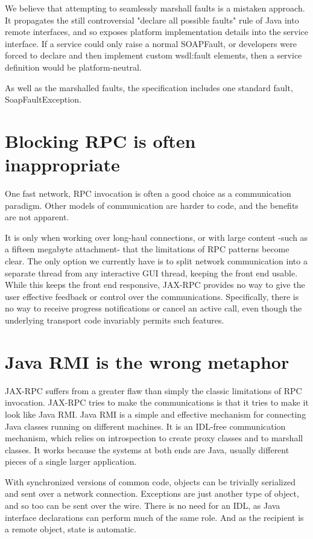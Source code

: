 \documentclass[draft]{article}
\begin{document}
We believe that attempting to seamlessly marshall faults is a mistaken approach.
It propagates the still controversial "declare all possible faults" rule of Java
into remote interfaces, and so exposes platform implementation details into the
service interface. If a service could only raise a normal SOAPFault, or
developers were forced to declare and then implement custom wsdl:fault elements,
then a service definition would be platform-neutral. 

As well as the marshalled faults, the specification includes one
standard fault, SoapFaultException. 

\section{Blocking RPC is often inappropriate}

One fast network, RPC invocation is often a good choice as a
communication paradigm. Other models of communication are harder to
code, and the benefits are not apparent. 

It is only when working over long-haul connections, or with large
content -such as a fifteen megabyte attachment- that the limitations of
RPC patterns become clear. The only option we currently have is
to split network communication into a separate thread from any
interactive GUI thread, keeping the front end usable. While this keeps 
the front end responsive, JAX-RPC provides no way to give the user
effective feedback or control over the communications. Specifically,  
there is no way to receive
progress notifications or cancel an active call, even though the underlying 
transport code invariably permits such features. 


\section{Java RMI is the wrong metaphor}

JAX-RPC suffers from a greater flaw than simply the classic limitations
of RPC invocation. JAX-RPC tries to make the communications is
that it tries to make it look like Java RMI. Java RMI is a simple and effective
mechanism for connecting Java classes running on different machines. It is an
IDL-free communication mechanism, which relies on introspection to create proxy
classes and to marshall classes. It works because the systems at both ends are
Java, usually different pieces of a single larger application. 

With synchronized versions of common code, objects can be trivially
serialized and sent over a network connection. Exceptions are just
another type of object, and so too can be sent over the wire. There is
no need for an IDL, as Java interface declarations can perform much of
the same role. And as the recipient is a remote object, state is
automatic.
\end{document}
